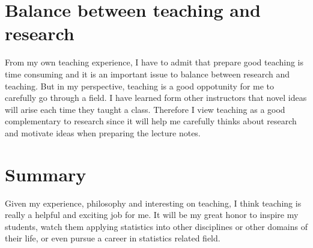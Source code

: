 \documentclass[12pt]{amsart} \usepackage{amssymb}
\begin{document}
\section{Balance between teaching and research}

From my own teaching experience,
I have to admit that prepare good teaching is time consuming and it is an important issue to balance between research and teaching.
But in my perspective, teaching is a good oppotunity for me to carefully go through a field.
I have learned form other instructors that novel ideas will arise each time they taught a class.
Therefore I view teaching as a good complementary to research since it will help me carefully thinks about research and motivate ideas when preparing the lecture notes.

\section{Summary}
Given my experience, philosophy and interesting on teaching,
I think teaching is really a helpful and exciting job for me.
It will be my great honor to inspire my students,
watch them applying statistics into other disciplines or other domains of their life,
or even pursue a career in statistics related field. 
\end{document}
